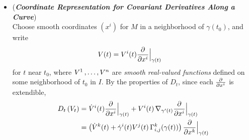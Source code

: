 \documentclass[11pt]{article}
\begin{document}
\begin{itemize}
\item \begin{remark} (\emph{\textbf{Coordinate Representation for Covariant Derivatives Along a Curve}})\\
Choose smooth coordinates $(x^i)$ for $M$ in a neighborhood of $\gamma(t_0)$, and write
\begin{align*}
V(t) &=  V^{i}(t) \frac{\partial }{ \partial x^i}\Bigr|_{\gamma(t)}
\end{align*} for $t$ near $t_0$, where $V^1 \,{,}\ldots{,}\, V^n$ are \emph{smooth real-valued functions} defined on some neighborhood of $t_0$ in $I$. By the properties of $D_t$, since each $\frac{\partial }{ \partial x^i}$ is extendible,
\begin{align}
D_t\left(V_t\right) &= \dot{V}^i(t) \frac{\partial }{ \partial x^i}\Bigr|_{\gamma(t)} + V^i(t)\, \nabla_{\gamma'(t)}{\frac{\partial }{ \partial x^i}\Bigr|_{\gamma(t)}} \nonumber\\
&= \left(\dot{V}^k(t)  + \dot{\gamma}^{i}(t)V^j(t)\,\Gamma_{i,j}^{k}(\gamma(t))\right)\frac{\partial }{ \partial x^k}\Bigr|_{\gamma(t)} \label{eqn: covariant_derivative_along_curve_represent}
\end{align}
\end{remark}
\end{itemize}
\end{document}

